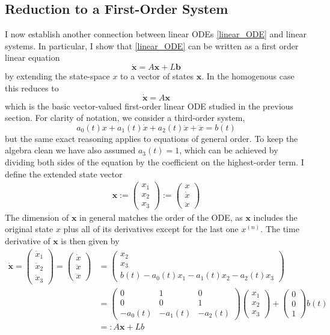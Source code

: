 \documentclass[12pt]{article}
\newcommand{\bx}{\mathbf{x}}
\newcommand{\bb}{\mathbf{b}}
\begin{document}
\subsection{Reduction to a First-Order System}
I now establish another connection between linear ODEs \ref{linear_ODE} and linear systems. In particular, I show that \ref{linear_ODE} can be written as a first order linear 
equation 
\[\dot{\bx} = A \bx + L \bb \]
by extending the state-space $x$ to a vector of states $\bx$. In the homogenous case this reduces to 
\[\dot{\bx} = A \bx\]
which is the basic vector-valued first-order linear ODE studied in the previous section. For clarity of notation, we consider a third-order system,
\[a_0(t) x + a_1(t) \dot{x} + a_2(t) \ddot{x} + \dddot{x} = b(t)\]
but the same exact reasoning applies to equations of general order. To keep the algebra clean we have also assumed $a_3(t) = 1$, which can be achieved by dividing both 
sides of the equation by the coefficient on the highest-order term. I define the extended state vector 
\begin{align*}
\bx :=  \begin{pmatrix} x_1 \\ x_2 \\ x_3 \end{pmatrix} := \begin{pmatrix} x \\ \dot{x} \\ \ddot{x} \end{pmatrix}
\end{align*}
The dimension of $\bx$ in general matches the order of the ODE, as $\bx$ includes the original state $x$ plus all of its derivatives except for the last one $x^{(n)}$. 
The time derivative of $\bx$ is then given by 
\begin{align*}
\dot{\bx} =  \begin{pmatrix} \dot{x}_1 \\ \dot{x}_2 \\ \dot{x}_3 \end{pmatrix} = \begin{pmatrix} \dot{x} \\ \ddot{x} \\ \dddot{x} \end{pmatrix} &=  
\begin{pmatrix} x_2 \\ x_3 \\ b(t) -  a_0(t) x_1 - a_1(t) x_2 - a_2(t) x_3 \end{pmatrix} \\
&= \begin{pmatrix} 0 & 1 & 0 \\ 0 & 0 & 1 \\ -a_0(t) & -a_1(t) & -a_2(t) \end{pmatrix}  \begin{pmatrix} x_1 \\ x_2 \\ x_3 \end{pmatrix} + \begin{pmatrix} 0 \\ 0 \\ 1 \end{pmatrix} b(t) \\
&=: A\bx + L b
\end{align*}
\end{document}
